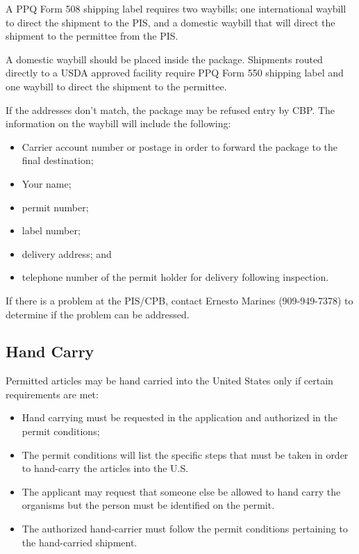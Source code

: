 \documentclass[12pt]{../SOP3}\usepackage[]{graphicx}\usepackage[]{color}
\begin{document}
\NP A PPQ Form 508 shipping label requires two waybills; one international waybill to direct the shipment to the PIS, and a domestic waybill that will direct the shipment to the permittee from the PIS. 

\NP A domestic waybill should be placed inside the package. Shipments routed directly to a USDA approved facility require PPQ Form 550 shipping label and one waybill to direct the shipment to the permittee. 

\NP If the addresses don't match, the package may be refused entry by CBP. The information on the waybill will include the following: 

\begin{itemize}
\item Carrier account number or postage in order to forward the package to the final destination; 
\item Your name;
\item permit number; 
\item label number; 
\item delivery address; and 
\item telephone number of the permit holder for delivery following inspection.
\end{itemize}

\NP If there is a problem at the PIS/CPB, contact Ernesto Marines (909-949-7378) to determine if the problem can be addressed. 

\subsection{Hand Carry}

\NP Permitted articles may be hand carried into the United States only if certain requirements are met: 

\begin{itemize}
  \item Hand carrying must be requested in the application and authorized in the permit conditions;
  \item The permit conditions will list the specific steps that must be taken in order to hand-carry the articles into the U.S. 
  \item The applicant may request that someone else be allowed to hand carry the organisms but the person must be identified on the permit.
  \item The authorized hand-carrier must follow the permit conditions pertaining to the hand-carried shipment.
\end{itemize}
\end{document}
